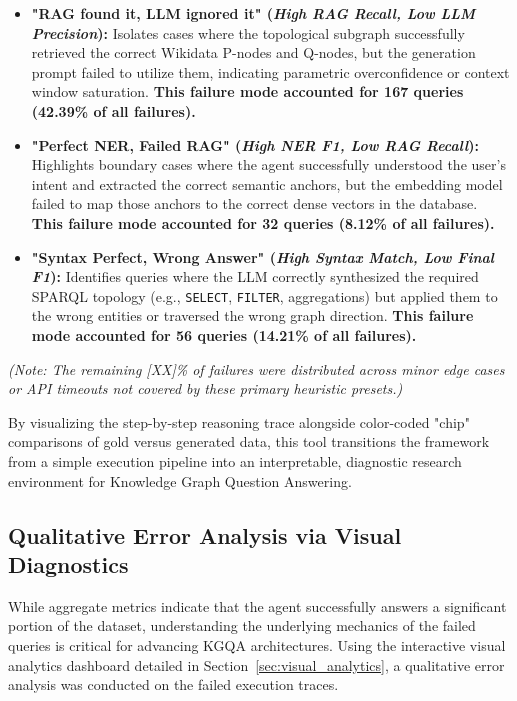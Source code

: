 \begin{itemize}
    \item \textbf{"RAG found it, LLM ignored it" (\textit{High RAG Recall, Low LLM Precision}):} Isolates cases where the topological subgraph successfully retrieved the correct Wikidata P-nodes and Q-nodes, but the generation prompt failed to utilize them, indicating parametric overconfidence or context window saturation. \textbf{This failure mode accounted for 167 queries (42.39\% of all failures).}
    
    \item \textbf{"Perfect NER, Failed RAG" (\textit{High NER F1, Low RAG Recall}):} Highlights boundary cases where the agent successfully understood the user's intent and extracted the correct semantic anchors, but the embedding model failed to map those anchors to the correct dense vectors in the database. \textbf{This failure mode accounted for 32 queries (8.12\% of all failures).}
    
    \item \textbf{"Syntax Perfect, Wrong Answer" (\textit{High Syntax Match, Low Final F1}):} Identifies queries where the LLM correctly synthesized the required SPARQL topology (e.g., \texttt{SELECT}, \texttt{FILTER}, aggregations) but applied them to the wrong entities or traversed the wrong graph direction. \textbf{This failure mode accounted for 56 queries (14.21\% of all failures).}
\end{itemize}

\textit{(Note: The remaining [XX]\% of failures were distributed across minor edge cases or API timeouts not covered by these primary heuristic presets.)}

By visualizing the step-by-step reasoning trace alongside color-coded "chip" comparisons of gold versus generated data, this tool transitions the framework from a simple execution pipeline into an interpretable, diagnostic research environment for Knowledge Graph Question Answering.


\subsection{Qualitative Error Analysis via Visual Diagnostics}
\label{sec:error_analysis}

While aggregate metrics indicate that the agent successfully answers a significant portion of the dataset, understanding the underlying mechanics of the failed queries is critical for advancing KGQA architectures. Using the interactive visual analytics dashboard detailed in Section~\ref{sec:visual_analytics}, a qualitative error analysis was conducted on the failed execution traces. 

